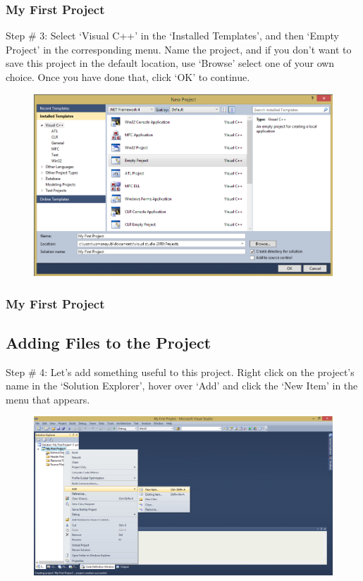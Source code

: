\documentclass{beamer}
\begin{document}
\begin{frame}
    \frametitle{My First Project}
    Step \# 3: Select `Visual C++' in the `Installed Templates', and then `Empty Project' in the corresponding menu. Name the project, and if you don't want to save this project in the default location, use `Browse' select one of your own choice. Once you have done that, click `OK' to continue.
    \begin{figure}
        \centering
        \includegraphics[scale=0.35]{step_9}
    \end{figure}
\end{frame}

\begin{frame}
    \frametitle{My First Project}
    \subsection{Adding Files to the Project} %
    \label{sub:adding_files}
    Step \# 4: Let's add something useful to this project. Right click on the project's name in the `Solution Explorer', hover over `Add' and click the `New Item' in the menu that appears.
    \begin{figure}
        \centering
        \includegraphics[scale=0.315]{step_10}
    \end{figure}
\end{frame}
\end{document}
